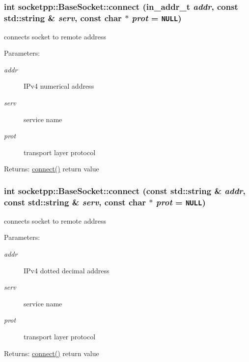 \begin{CompactItemize}
{\subsubsection[{connect}]{\setlength{\rightskip}{0pt plus 5cm}int socketpp::BaseSocket::connect (in\_\-addr\_\-t {\em addr}, \/  const std::string \& {\em serv}, \/  const char $\ast$ {\em prot} = {\tt NULL})}}
\label{classsocketpp_1_1BaseSocket_83666b030a93368675a842a992e0c2af}


connects socket to remote address 

\begin{Desc}
\item[Parameters:]
\begin{description}
\item[{\em addr}]IPv4 numerical address \item[{\em serv}]service name \item[{\em prot}]transport layer protocol \end{description}
\end{Desc}
\begin{Desc}
\item[Returns:]\hyperlink{classsocketpp_1_1BaseSocket_769710192256606aaec1a776468d75fa}{connect()} return value \end{Desc}
\hypertarget{classsocketpp_1_1BaseSocket_eb0f4c84546c22fd9023169701d8fae8}{
\subsubsection[{connect}]{\setlength{\rightskip}{0pt plus 5cm}int socketpp::BaseSocket::connect (const std::string \& {\em addr}, \/  const std::string \& {\em serv}, \/  const char $\ast$ {\em prot} = {\tt NULL})}}
\label{classsocketpp_1_1BaseSocket_eb0f4c84546c22fd9023169701d8fae8}


connects socket to remote address 

\begin{Desc}
\item[Parameters:]
\begin{description}
\item[{\em addr}]IPv4 dotted decimal address \item[{\em serv}]service name \item[{\em prot}]transport layer protocol \end{description}
\end{Desc}
\begin{Desc}
\item[Returns:]\hyperlink{classsocketpp_1_1BaseSocket_769710192256606aaec1a776468d75fa}{connect()} return value \end{Desc}
\hypertarget{classsocketpp_1_1BaseSocket_2bdd6d459e6f9cf2f71636b01787b250}{
}
\end{CompactItemize}
